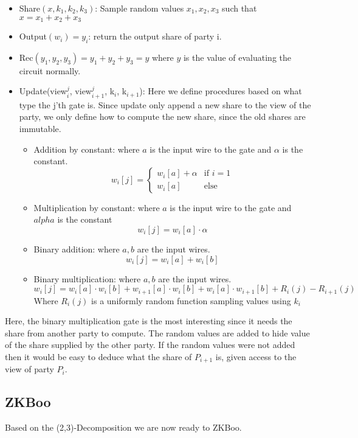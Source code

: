 \begin{itemize}
  \item Share$(x, k_{1}, k_{2}, k_{3})$: Sample random values
    $x_{1}, x_{2}, x_{3}$ such that $x = x_{1} + x_{2} + x_{3}$
  \item Output$(w_{i}) = y_{i}$: return the output share of party i.
  \item Rec$(y_{1}, y_{2}, y_{3}) = y_{1} + y_{2} + y_{3} = y$ where $y$ is the
    value of evaluating the circuit normally.
  \item Update(view$^{j}_{i}$, view$^{j}_{i+1}$, k$_{i}$, k$_{i+1}$): Here we
    define procedures based on what type the j'th gate is. Since update only
    append a new share to the view of the party, we only define how to compute
    the new share, since the old shares are immutable.
    \begin{itemize}
      \item Addition by constant: where $a$ is the input wire to the gate
        and $\alpha$ is the constant.
        $$ w_{i}[j] =
        \begin{cases} w_{i}[a] + \alpha & \text{if } i = 1 \\
                      w_{i}[a]          & \text{else}       %
        \end{cases}$$
      \item Multiplication by constant: where $a$ is the input wire to the gate
        and $alpha$ is the constant
        $$ w_{i}[j] = w_{i}[a] \cdot \alpha$$
      \item Binary addition: where $a, b$ are the input wires.
        $$
        w_{i}[j] = w_{i}[a] + w_{i}[b]
        $$
      \item Binary multiplication: where $a, b$ are the input wires.
        $$
        w_{i}[j] = w_{i}[a] \cdot w_{i}[b] + w_{i+1}[a] \cdot w_{i}[b] + w_{i}[a] \cdot w_{i+1}[b] + R_{i}(j) - R_{i+1}(j)
        $$
        Where $R_{i}(j)$ is a uniformly random function sampling values using $k_{i}$
    \end{itemize}
\end{itemize}

Here, the binary multiplication gate is the most interesting since it needs the
share from another party to compute. The random values are added to hide value
of the share supplied by the other party.
If the random values were not added then it
would be easy to deduce what the share of $P_{i+1}$ is, given access to the
view of party $P_{i}$.

\subsection{ZKBoo}
\label{subsec:general:zkboo}
Based on the (2,3)-Decomposition we are now ready to ZKBoo.

